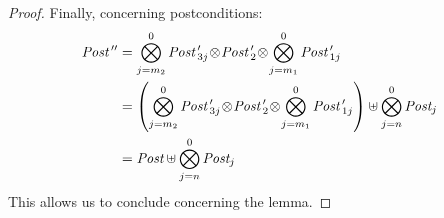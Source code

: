 \documentclass{lmcs}
\newcommand{\shortotimes}{\!\otimes\!}
\begin{document}
\begin{proof}
Finally, concerning postconditions:
{\footnotesize \begin{equation*}
\begin{split}
\Post\,''&=\bigotimes_{j=m_2}^{0}\Post\,'_{3j}\shortotimes\Post\,'_2\shortotimes\bigotimes_{j=m_1}^{0}\Post\,'_{1j}\\
&=\left(\bigotimes_{j=m_2}^{0}\Post\,'_{3j}\shortotimes\Post\,'_2\shortotimes\bigotimes_{j=m_1}^{0}\Post\,'_{1j}\right)\uplus \bigotimes_{j=n}^{0}\Post_j\\
&=\Post \uplus \bigotimes_{j=n}^{0}\Post_j\
\end{split}
\end{equation*}
}
This allows us to conclude concerning the lemma. 
\end{proof}

\end{document}

